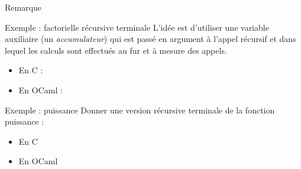 \documentclass[10pt]{beamer}
\begin{document}
\begin{frame}[fragile]{\Ctitle}{\stitle}
\begin{block}{Remarque}
		\onslide<2> \nbput{\textcolor{blue}{\footnotesize renvoie 1}}
		\onslide<3> \nbput{\textcolor{blue}{\footnotesize renvoie 1}}
		\onslide<4> \nbput{\textcolor{blue}{\footnotesize renvoie 2}}
		\onslide<5> \nbput{\textcolor{blue}{\footnotesize renvoie 6}}

	\end{block}

\end{frame}

\begin{frame}{\Ctitle}{\stitle}
	\begin{exampleblock}{Exemple :  factorielle récursive terminale}
		L'idée est d'utiliser une variable auxiliaire (un \textit{accumulateur}) qui est passé en argument à l'appel récursif et dans lequel les calculs sont effectués au fur et à mesure des appels.
		\begin{itemize}
			\item<2->En C :
			\onslide<2->
			\item<2->En OCaml :
			\onslide<2->
		\end{itemize}
	\end{exampleblock}
\end{frame}

\begin{frame}{\Ctitle}{\stitle}
	\begin{exampleblock}{Exemple :  puissance}
		Donner une version récursive terminale de la fonction puissance :
		\begin{itemize}
			\item<2-> En C
				\onslide<3->
			\item<4-> En OCaml
				\onslide<4->
		\end{itemize}
	\end{exampleblock}
\end{frame}
\end{document}
